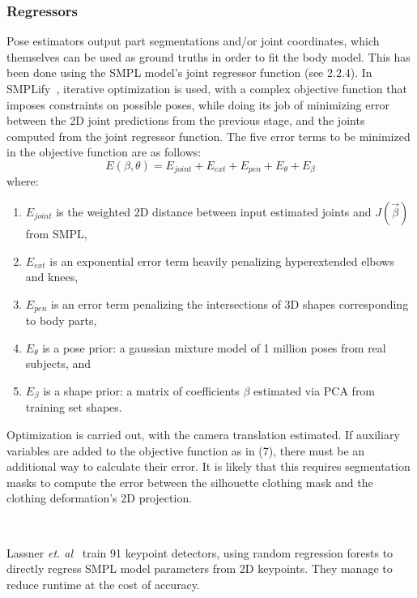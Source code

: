 \documentclass[9pt,twocolumn]{article}
\begin{document}
{		\subsubsection{Regressors}

			\par{Pose estimators output part segmentations and/or joint coordinates, which themselves can be used as ground truths in
			order to fit the body model. This has been done using the SMPL model's joint regressor function (see 2.2.4). In SMPLify~\cite{smplify},
			iterative optimization is used, with a complex objective function that imposes constraints on possible poses, while doing its job
			of minimizing error between the 2D joint predictions from the previous stage, and the joints computed from the joint regressor function.
			The five error terms to be minimized in the objective function are as follows:
			\begin{equation}
				E(\beta,\theta) = E_{joint} + E_{ext} + E_{pen} + E_{\theta} +  E_{\beta}
			\end{equation}
			where:
			\begin{enumerate}
				\item $E_{joint}$ is the weighted 2D distance between input estimated joints and $J(\vec{\beta})$ from SMPL,
				\item $E_{ext}$ is an exponential error term heavily penalizing hyperextended elbows and knees,
				\item $E_{pen}$ is an error term penalizing the intersections of 3D shapes corresponding to body parts,
				\item $E_{\theta}$ is a pose prior: a gaussian mixture model of 1 million poses from real subjects, and
				\item $E_{\beta}$ is a shape prior: a matrix of coefficients $\beta$ estimated via PCA from training set shapes.
			\end{enumerate}
			Optimization is carried out, with the camera translation estimated. If auxiliary variables are added to the objective function as in
			(7), there must be an additional way to calculate their error. It is likely that this requires segmentation masks to compute the error
			between the silhouette clothing mask and the clothing deformation's 2D projection.}\\

			\par{Lassner \textit{et. al}~\cite{up} train 91 keypoint detectors, using random regression forests to directly regress SMPL model
			parameters from 2D keypoints. They manage to reduce runtime at the cost of accuracy.}

}
\end{document}
